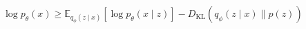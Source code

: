 $\log p_\theta(x)\ge\mathbb{E}_{q_\phi(z\mid x)}\left[\log p_\theta(x\mid z)\right]-D_{\mathrm{KL}}\left(q_\phi(z\mid x)\lVert p(z)\right)$
